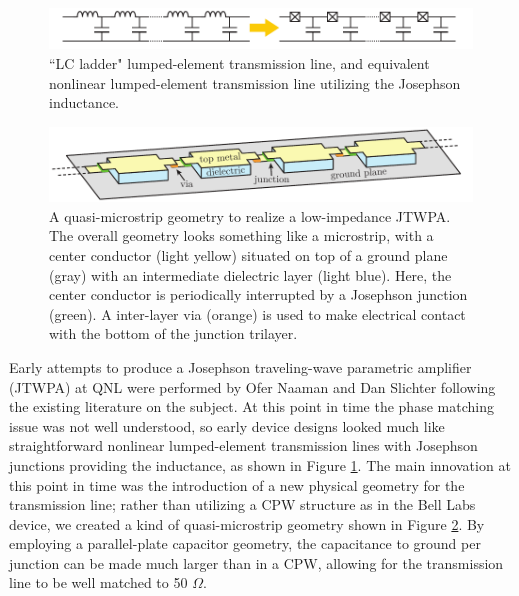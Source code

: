 \begin{figure}
\begin{center}
	\includegraphics[width = 6in]{paramps_chapter/TWPA_circuit}
\end{center}
\caption[Circuit model for simple Josephson traveling-wave amplifier]{``LC ladder" lumped-element transmission line, and equivalent nonlinear lumped-element transmission line utilizing the Josephson inductance.}
\label{fig:TWPA_circuit}
\end{figure}

\begin{figure}
\begin{center}
	\includegraphics[width = 6in]{paramps_chapter/TWPA_geometry}
\end{center}
\caption[JTWPA in quasi-microstrip geometry]{A quasi-microstrip geometry to realize a low-impedance JTWPA.  The overall geometry looks something like a microstrip, with a center conductor (light yellow) situated on top of a ground plane (gray) with an intermediate dielectric layer (light blue).  Here, the center conductor is periodically interrupted by a Josephson junction (green).  A inter-layer via (orange) is used to make electrical contact with the bottom of the junction trilayer.}
\label{fig:TWPA_geometry}
\end{figure}

Early attempts to produce a Josephson traveling-wave parametric amplifier (JTWPA) at QNL were performed by Ofer Naaman and Dan Slichter following the existing literature on the subject.  At this point in time the phase matching issue was not well understood, so early device designs looked much like straightforward nonlinear lumped-element transmission lines with Josephson junctions providing the inductance, as shown in Figure \ref{fig:TWPA_circuit}.  The main innovation at this point in time was the introduction of a new physical geometry for the transmission line; rather than utilizing a CPW structure as in the Bell Labs device, we created a kind of quasi-microstrip geometry shown in Figure \ref{fig:TWPA_geometry}.  By employing a parallel-plate capacitor geometry, the capacitance to ground per junction can be made much larger than in a CPW, allowing for the transmission line to be well matched to 50 $\Omega$.

